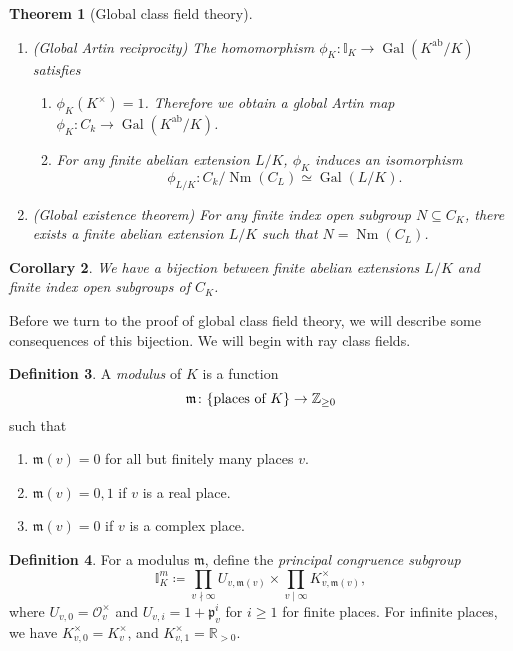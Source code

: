 \documentclass[leqno, openany]{memoir}
\newtheorem{thm}{Theorem}[section]
\newtheorem{cor}[thm]{Corollary}
\theoremstyle{definition}
\newtheorem{defn}[thm]{Definition}
\theoremstyle{remark}
\theoremstyle{plain}
\theoremstyle{definition}
\theoremstyle{remark}
\newcommand{\R}{\mathbb{R}}
\newcommand{\Z}{\mathbb{Z}}
\newcommand{\I}{\mathbb{I}}
\newcommand{\mc}[1]{\mathcal{#1}}
\newcommand{\mf}[1]{\mathfrak{#1}}
\newcommand{\mr}[1]{\mathrm{#1}}
\DeclareMathOperator{\Gal}{Gal}
\DeclareMathOperator{\Nm}{Nm}
\begin{document}
\begin{thm}[Global class field theory]\leavevmode \begin{enumerate} \item
    (Global Artin reciprocity) The homomorphism $\phi_K \colon \I_K \to
    \Gal(K^{\mr{ab}}/K)$ satisfies \begin{enumerate} \item $\phi_K(K^{\times})
        = 1$. Therefore we obtain a global Artin map $\phi_K \colon C_k \to
        \Gal(K^{\mr{ab}}/K)$.  \item For any finite abelian extension $L/K$,
    $\phi_K$ induces an isomorphism \[ \phi_{L/K} \colon C_k/\Nm(C_L) \simeq
\Gal(L/K). \] \end{enumerate} \item (Global existence theorem) For any finite
index open subgroup $N \subseteq C_K$, there exists a finite abelian extension
$L/K$ such that $N = \Nm(C_L)$.  \end{enumerate} \end{thm}

\begin{cor} We have a bijection between finite abelian extensions $L/K$ and
finite index open subgroups of $C_K$.  \end{cor}

Before we turn to the proof of global class field theory, we will describe some
consequences of this bijection. We will begin with ray class fields.

\begin{defn} A \textit{modulus} of $K$ is a function \[ \mf{m} \colon
    \qty{\text{places of $K$}} \to \Z_{\geq 0} \] such that \begin{enumerate}
    \item $\mf{m}(v) = 0$ for all but finitely many places $v$.  \item
        $\mf{m}(v) = 0,1$ if $v$ is a real place.  \item $\mf{m}(v) = 0$ if $v$
is a complex place.  \end{enumerate} \end{defn}


\begin{defn} For a modulus $\mf{m}$, define the \textit{principal congruence
    subgroup} \[ \I_K^m \coloneqq \prod_{v \nmid \infty} U_{v, \mf{m}(v)}
    \times \prod_{v \mid \infty} K_{v, \mf{m}(v)}^{\times}, \] where $U_{v,0} =
    \mc{O}_v^{\times}$ and $U_{v,i} = 1 + \mf{p}_v^i$ for $i \geq 1$ for finite
    places. For infinite places, we have $K_{v,0}^{\times} = K_v^{\times}$, and
    $K_{v,1}^{\times} = \R_{>0}$.  \end{defn}
\end{document}

